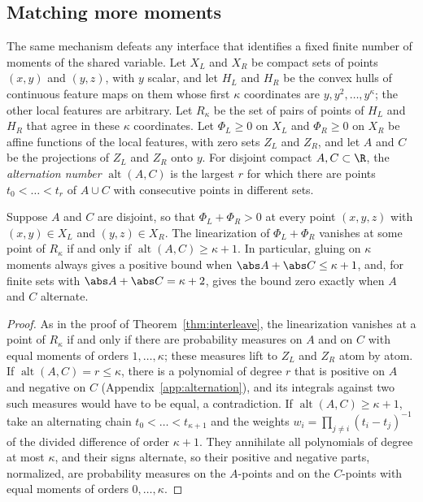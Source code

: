 \subsection{Matching more moments}\label{sec:k-moments}

The same mechanism defeats any interface that identifies a fixed finite
number of moments of the shared variable. Let $X_L$ and $X_R$ be compact
sets of points $(x,y)$ and $(y,z)$, with $y$ scalar, and let $H_L$ and $H_R$
be the convex hulls of continuous feature maps on them whose first $\kappa$
coordinates are $y,y^2,\dots,y^\kappa$; the other local features are
arbitrary. Let $R_\kappa$ be the set of pairs of points of $H_L$ and $H_R$
that agree in these $\kappa$ coordinates. Let $\Phi_L\ge0$ on $X_L$ and
$\Phi_R\ge0$ on $X_R$ be affine functions of the local features, with zero
sets $Z_L$ and $Z_R$, and let $A$ and $C$ be the projections of $Z_L$ and
$Z_R$ onto $y$. For disjoint compact $A,C\subset\R$, the \emph{alternation
number} $\operatorname{alt}(A,C)$ is the largest $r$ for which there are
points $t_0<\dots<t_r$ of $A\cup C$ with consecutive points in different
sets.

\begin{theorem}[Alternation]\label{thm:alternation}
Suppose $A$ and $C$ are disjoint, so that $\Phi_L+\Phi_R>0$ at every point
$(x,y,z)$ with $(x,y)\in X_L$ and $(y,z)\in X_R$. The linearization of
$\Phi_L+\Phi_R$ vanishes at some point of $R_\kappa$ if and only if
$\operatorname{alt}(A,C)\ge\kappa+1$. In particular, gluing on $\kappa$
moments always gives a positive bound when $\abs A+\abs C\le\kappa+1$, and,
for finite sets with $\abs A+\abs C=\kappa+2$, gives the bound zero exactly
when $A$ and $C$ alternate.
\end{theorem}

\begin{proof}
As in the proof of Theorem~\ref{thm:interleave}, the linearization vanishes
at a point of $R_\kappa$ if and only if there are probability measures on
$A$ and on $C$ with equal moments of orders $1,\dots,\kappa$; these measures
lift to $Z_L$ and $Z_R$ atom by atom. If $\operatorname{alt}(A,C)=r\le\kappa$,
there is a polynomial of degree $r$ that is positive on $A$ and negative on
$C$ (Appendix~\ref{app:alternation}), and its integrals against two such
measures would have to be equal, a contradiction. If
$\operatorname{alt}(A,C)\ge\kappa+1$, take an alternating chain
$t_0<\dots<t_{\kappa+1}$ and the weights $w_i=\prod_{j\ne i}(t_i-t_j)^{-1}$
of the divided difference of order $\kappa+1$. They annihilate all
polynomials of degree at most $\kappa$, and their signs alternate, so their
positive and negative parts, normalized, are probability measures on the
$A$-points and on the $C$-points with equal moments of orders
$0,\dots,\kappa$.
\end{proof}

